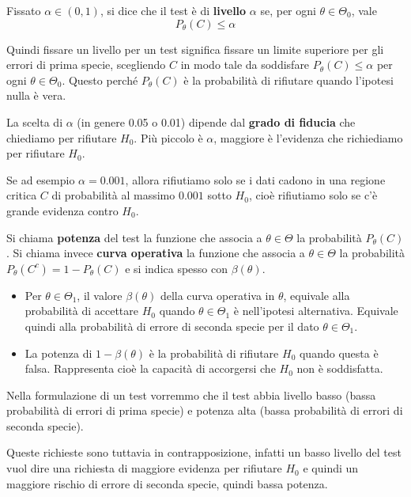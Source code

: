 \begin{definition}
	Fissato $\alpha \in (0,1)$, si dice che il test è di \textbf{livello} $\alpha$ se, per ogni
	$\theta \in \Theta_0$, vale
	\[ P_\theta (C) \leq \alpha \]
\end{definition}

Quindi fissare un livello per un test significa fissare un limite superiore per gli errori di
prima specie, scegliendo $C$ in modo tale da soddisfare $P_\theta (C) \leq \alpha$ per ogni
$\theta \in \Theta_0$. Questo perché $P_\theta(C)$ è la probabilità di rifiutare quando l'ipotesi
nulla è vera.

La scelta di $\alpha$ (in genere 0.05 o 0.01) dipende dal \textbf{grado di fiducia} che chiediamo
per rifiutare $H_0$. Più piccolo è $\alpha$, maggiore è l'evidenza che richiediamo per rifiutare
$H_0$.

Se ad esempio $\alpha = 0.001$, allora rifiutiamo solo se i dati cadono in una regione critica $C$
di probabilità al massimo $0.001$ sotto $H_0$, cioè rifiutiamo solo se c'è grande evidenza contro
$H_0$.

\begin{definition}
	Si chiama \textbf{potenza} del test la funzione che associa a $\theta \in \Theta$ la
	probabilità $P_\theta(C)$. Si chiama invece \textbf{curva operativa} la funzione che associa
	a $\theta \in \Theta$ la probabilità $P_\theta (C^c) = 1 - P_\theta(C)$ e si indica spesso con
	$\beta(\theta)$.
	\begin{itemize}
		\item Per $\theta \in \Theta_1$, il valore $\beta(\theta)$ della curva operativa in
		      $\theta$, equivale alla probabilità di accettare $H_0$ quando $\theta \in \Theta_1$
		      è nell'ipotesi alternativa. Equivale quindi alla probabilità di errore di seconda
		      specie per il dato $\theta \in \Theta_1$.
		\item La potenza di $1 - \beta(\theta)$ è la probabilità di rifiutare $H_0$ quando questa
		      è falsa. Rappresenta cioè la capacità di accorgersi che $H_0$ non è soddisfatta.
	\end{itemize}
\end{definition}

Nella formulazione di un test vorremmo che il test abbia livello basso (bassa probabilità di errori
di prima specie) e potenza alta (bassa probabilità di errori di seconda specie).

Queste richieste sono tuttavia in contrapposizione, infatti un basso livello del test vuol dire una
richiesta di maggiore evidenza per rifiutare $H_0$ e quindi un maggiore rischio di errore di
seconda specie, quindi bassa potenza.

